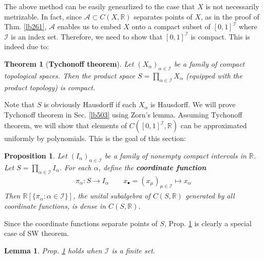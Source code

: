 \documentclass[12pt,b5paper,notitlepage]{article}
\theoremstyle{definition}
\theoremstyle{plain}
\newtheorem{thm}[df]{Theorem}
\newtheorem{pp}[df]{Proposition}
\newtheorem{lm}[df]{Lemma}
\newcommand{\scr}{\mathscr}
\newcommand{\blt}{\bullet}
\newcommand{\Rbb}{\mathbb R}
\numberwithin{equation}{section}
\begin{document}
The above method can be easily genearlized to the case that $X$ is not necessarily metrizable. In fact, since $\scr A\subset C(X,\Rbb)$ separates points of $X$, as in the proof of  Thm. \ref{lb261}, $\scr A$ enables us to embed $X$ onto a compact subset of $[0,1]^{\scr I}$ where $\scr I$ is an index set. Therefore, we need to show that $[0,1]^{\scr I}$ is compact. This is indeed due to:


\begin{thm}[\textbf{Tychonoff theorem}]\label{lb452}
Let $(X_\alpha)_{\alpha\in\scr I}$ be a family of compact topological spaces. Then the product space $S=\prod_{\alpha\in\scr I}X_\alpha$ (equipped with the product topology) is compact.
\end{thm}

Note that $S$ is obviously Hausdorff if each $X_\alpha$ is Hausdorff. We will prove Tychonoff theorem in Sec. \ref{lb503} using Zorn's lemma. Assuming Tychonoff theorem, we will show that elements of $C([0,1]^{\scr I},\Rbb)$ can be approximated uniformly by polynomials. This is the goal of this section:


\begin{pp}\label{lb451}
Let $(I_\alpha)_{\alpha\in\scr I}$ be a family of nonempty compact  intervals in $\Rbb$. Let $S=\prod_{\alpha\in\scr I}I_\alpha$. For each $\alpha$, define the \textbf{coordinate function}
\begin{align*}
\pi_\alpha:S\rightarrow I_\alpha\qquad x_\blt=(x_\mu)_{\mu\in\scr I}\mapsto x_\alpha
\end{align*}
Then $\Rbb[\{\pi_\alpha:\alpha\in\scr I\}]$, the unital subalgebra of $C(S,\Rbb)$ generated by all coordinate functions, is dense in $C(S,\Rbb)$.
\end{pp}


Since the coordinate functions separate points of $S$, Prop. \ref{lb451} is clearly a special case of SW theorem. %


\begin{lm}\label{lb456}
Prop. \ref{lb451} holds when $\scr I$ is a finite set.
\end{lm}
\end{document}

